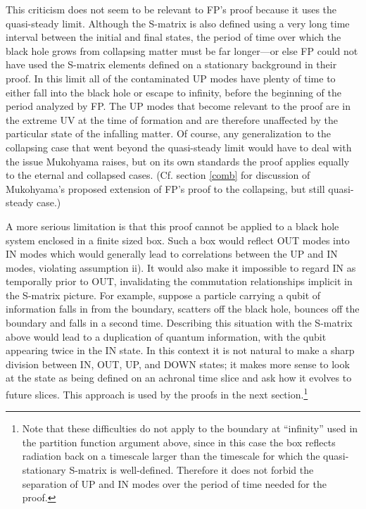 \documentclass[12pt]{article}
\begin{document}
This criticism does not seem to be relevant to FP's proof because it uses the quasi-steady limit.  Although the S-matrix is also defined using a very long time interval between the initial and final states, the period of time over which the black hole grows from collapsing matter must be far longer---or else FP could not have used the S-matrix elements defined on a stationary background in their proof.  In this limit all of the contaminated UP modes have plenty of time to either fall into the black hole or escape to infinity, before the beginning of the period analyzed by FP.  The UP modes that become relevant to the proof are in the extreme UV at the time of formation and are therefore unaffected by the particular state of the infalling matter.  Of course, any generalization to the collapsing case that went beyond the quasi-steady limit would have to deal with the issue Mukohyama raises, but on its own standards the proof applies equally to the eternal and collapsed cases.  (Cf. section \ref{comb} for discussion of Mukohyama's proposed extension \cite{muko97} of FP's proof to the collapsing, but still quasi-steady case.)

A more serious limitation is that this proof cannot be applied to a black hole system enclosed in a finite sized box.  Such a box would reflect OUT modes into IN modes which would generally lead to correlations between the UP and IN modes, violating assumption ii).  It would also make it impossible to regard IN as temporally prior to OUT, invalidating the commutation relationships implicit in the S-matrix picture.  For example, suppose a particle carrying a qubit of information falls in from the boundary, scatters off the black hole, bounces off the boundary and falls in a second time.  Describing this situation with the S-matrix above would lead to a duplication of quantum information, with the qubit appearing twice in the IN state.  In this context it is not natural to make a sharp division between IN, OUT, UP, and DOWN states; it makes more sense to look at the state as being defined on an achronal time slice and ask how it evolves to future slices.  This approach is used by the proofs in the next section.\footnote{Note that these difficulties do not apply to the boundary at ``infinity'' used in the partition function argument above, since in this case the box reflects radiation back on a timescale larger than the timescale for which the quasi-stationary S-matrix is well-defined.  Therefore it does not forbid the separation of UP and IN modes over the period of time needed for the proof.}
\end{document}

